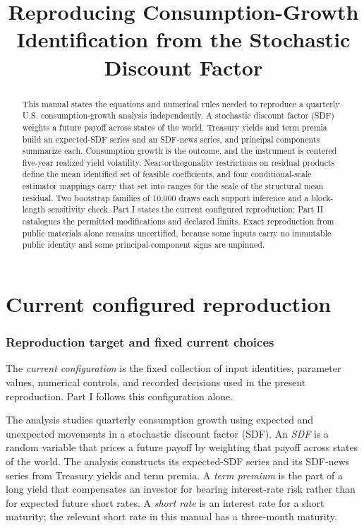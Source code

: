 \documentclass[11pt]{article}
\title{Reproducing Consumption-Growth Identification from the Stochastic Discount Factor}
\author{}
\date{}
\begin{document}
\maketitle

\begin{abstract}
This manual states the equations and numerical rules needed to reproduce a quarterly U.S.
consumption-growth analysis independently. A stochastic discount factor (SDF) weights a future
payoff across states of the world. Treasury yields and term premia build an expected-SDF series and
an SDF-news series, and principal components summarize each. Consumption growth is the outcome, and
the instrument is centered five-year realized yield volatility. Near-orthogonality restrictions on
residual products define the mean identified set of feasible coefficients, and four conditional-scale
estimator mappings carry that set into ranges for the scale of the structural mean residual. Two
bootstrap families of 10,000 draws each support inference and a block-length sensitivity check. Part
I states the current configured reproduction; Part II catalogues the permitted modifications and
declared limits. Exact reproduction from public materials alone remains uncertified, because some
inputs carry no immutable public identity and some principal-component signs are unpinned.
\end{abstract}

\tableofcontents
\newpage

\part{Current configured reproduction}

\section{Reproduction target and fixed current choices}
\label{sec:target}

The \emph{current configuration} is the fixed collection of input identities, parameter values,
numerical controls, and recorded decisions used in the present reproduction. Part I follows this
configuration alone.

The analysis studies quarterly consumption growth using expected and unexpected movements in a
stochastic discount factor (SDF). An \emph{SDF} is a random variable that prices a
future payoff by weighting that payoff across states of the world. The analysis constructs its
expected-SDF series and its SDF-news series from Treasury yields and term premia. A \emph{term
premium} is the part of a long yield that compensates an investor for bearing interest-rate risk
rather than for expected future short rates. A \emph{short rate} is an interest rate for a short
maturity; the relevant short rate in this manual has a three-month maturity.
\end{document}
